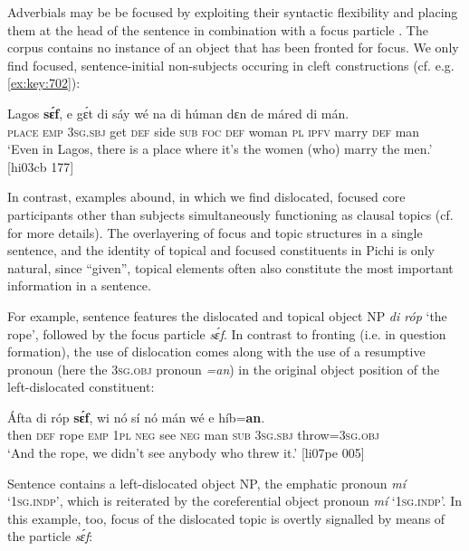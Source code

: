 Adverbials may be be focused by exploiting their syntactic flexibility and placing them at the head of the sentence in combination with a focus particle . The corpus contains no instance of an object that has been fronted for focus. We only find focused, sentence-initial non-subjects occuring in cleft constructions (cf. e.g. \ref{ex:key:702}):


\ea%
    \label{ex:key:686}
    \gll Lagos  \textbf{sɛ́f},  e    gɛ́t  di  sáy  wé  na  di  húman  dɛn 
de  máred  di  mán.\\
\textsc{place}  \textsc{emp}  \textsc{3sg.sbj}  get  \textsc{def}  side  \textsc{sub}  \textsc{foc}  \textsc{def}  woman  \textsc{pl} 
\textsc{ipfv}  marry  \textsc{def}  man\\

\glt ‘Even in Lagos, there is a place where it’s the women (who) 
marry the men.’ [hi03cb 177]
\z

In contrast, examples abound, in which we find dislocated, focused core participants other than subjects simultaneously functioning as clausal topics (cf.  for more details). The overlayering of focus and topic structures in a single sentence, and the identity of topical and focused constituents in Pichi is only natural, since “given”, topical elements often also constitute the most important information in a sentence. 


For example, sentence  features the dislocated and topical object NP \textit{di róp} ‘the rope’, followed by the focus particle \textit{sɛ́f}. In contrast to fronting (i.e. in question formation), the use of dislocation{\fff} comes along with the use of a resumptive pronoun{\fff} (here the \textsc{3sg.obj} pronoun \textit{=an}) in the original object position of the left-dislocated constituent:



\ea%
    \label{ex:key:687}
    \gll \'{A}fta    di  róp    \textbf{sɛ́f},  wi  nó  sí  nó  mán    wé  e    híb=\textbf{an}.\\
then  \textsc{def}  rope  \textsc{emp}  \textsc{1pl}  \textsc{neg}  see  \textsc{neg}  man    \textsc{sub}  \textsc{3sg.sbj}  throw=\textsc{3sg.obj}\\

\glt ‘And the rope, we didn’t see anybody who threw it.’ [li07pe 005]
\z

Sentence  contains a left-dislocated object NP, the emphatic pronoun \textit{mí} ‘\textsc{1sg.indp}’, which is reiterated by the coreferential object pronoun \textit{mí} ‘\textsc{1sg.indp}’. In this example, too, focus of the dislocated topic is overtly signalled by means of the particle \textit{sɛ́f}:

